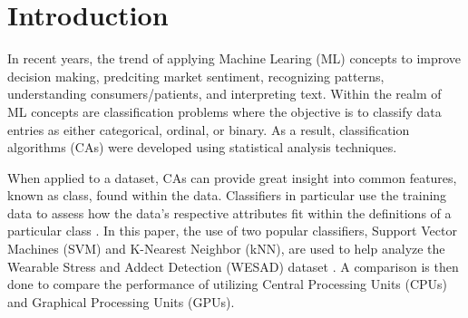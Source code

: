 \section{Introduction}
\label{sec:Introduction}

In recent years, the trend of applying Machine Learing (ML) concepts to improve decision making, predciting 
market sentiment, recognizing patterns, understanding consumers/patients, and interpreting text. 
Within the realm of ML concepts are classification problems where the objective is to classify data entries 
as either categorical, ordinal, or binary. 
As a result, classification algorithms (CAs) were developed using statistical analysis techniques. 

When applied to a dataset, CAs can provide great insight into common features, known as class,
found within the data. Classifiers in particular use the training data to assess how the data's respective 
attributes fit within the definitions of a particular class \cite{class}. In this paper, the use of two 
popular classifiers, Support Vector Machines (SVM) and K-Nearest Neighbor (kNN), are used to help 
analyze the Wearable Stress and Addect Detection (WESAD) dataset \cite{dataset}. A comparison is then done 
to compare the performance of utilizing Central Processing Units (CPUs) and Graphical Processing Units (GPUs). 
